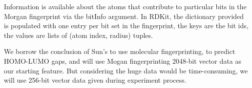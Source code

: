 Information is available about the atoms that contribute to particular bits in the Morgan fingerprint via the bitInfo argument. In RDKit, the dictionary provided is populated with one entry per bit set in the fingerprint, the keys are the bit ids, the values are lists of (atom index, radius) tuples.

We borrow the conclusion of Sun's to use molecular fingerprinting, to predict HOMO-LUMO gaps, and will use Mogan fingerprinting 2048-bit vector data as our starting feature. But considering the huge data would be time-consuming, we will use 256-bit vector data given during experiment process. 